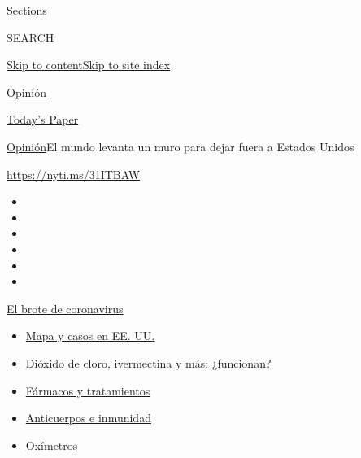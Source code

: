 Sections

SEARCH

\protect\hyperlink{site-content}{Skip to
content}\protect\hyperlink{site-index}{Skip to site index}

\href{https://www.nytimes3xbfgragh.onion/es/section/opinion}{Opinión}

\href{https://myaccount.nytimes3xbfgragh.onion/auth/login?response_type=cookie\&client_id=vi}{}

\href{https://www.nytimes3xbfgragh.onion/section/todayspaper}{Today's
Paper}

\href{/es/section/opinion}{Opinión}\textbar{}El mundo levanta un muro
para dejar fuera a Estados Unidos

\url{https://nyti.ms/31ITBAW}

\begin{itemize}
\item
\item
\item
\item
\item
\item
\end{itemize}

\href{https://www.nytimes3xbfgragh.onion/es/spotlight/coronavirus?action=click\&pgtype=Article\&state=default\&region=TOP_BANNER\&context=storylines_menu}{El
brote de coronavirus}

\begin{itemize}
\tightlist
\item
  \href{https://www.nytimes3xbfgragh.onion/es/interactive/2020/espanol/mundo/coronavirus-en-estados-unidos.html?action=click\&pgtype=Article\&state=default\&region=TOP_BANNER\&context=storylines_menu}{Mapa
  y casos en EE. UU.}
\item
  \href{https://www.nytimes3xbfgragh.onion/es/2020/07/23/espanol/america-latina/bolivia-cloro-coronavirus-ivermectina.html?action=click\&pgtype=Article\&state=default\&region=TOP_BANNER\&context=storylines_menu}{Dióxido
  de cloro, ivermectina y más: ¿funcionan?}
\item
  \href{https://www.nytimes3xbfgragh.onion/es/interactive/2020/science/coronavirus-tratamientos-curas.html?action=click\&pgtype=Article\&state=default\&region=TOP_BANNER\&context=storylines_menu}{Fármacos
  y tratamientos}
\item
  \href{https://www.nytimes3xbfgragh.onion/es/2020/07/28/espanol/ciencia-y-tecnologia/anticuerpos-coronavirus-inmunidad.html?action=click\&pgtype=Article\&state=default\&region=TOP_BANNER\&context=storylines_menu}{Anticuerpos
  e inmunidad}
\item
  \href{https://www.nytimes3xbfgragh.onion/es/2020/04/29/espanol/estilos-de-vida/oximetro-para-que-sirve.html?action=click\&pgtype=Article\&state=default\&region=TOP_BANNER\&context=storylines_menu}{Oxímetros}
\end{itemize}

